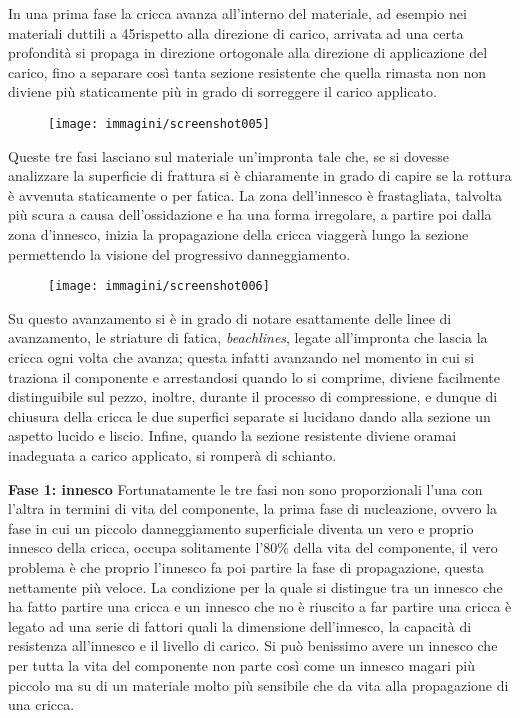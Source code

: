 \documentclass{article}
\begin{document}
\begin{adjustwidth}{2in}{}
		In una prima fase la cricca avanza all'interno del materiale, ad esempio nei materiali duttili a 45\degree rispetto alla direzione di carico, arrivata ad una certa profondità si propaga in direzione ortogonale alla direzione di applicazione del carico, fino a separare così tanta sezione resistente che quella rimasta non non diviene più staticamente più in grado di sorreggere il carico applicato. 
		
		\begin{figure}[H]
			\centering
			\texttt{[image: immagini/screenshot005]}
			\label{fig:screenshot005}
		\end{figure}
				
		Queste tre fasi lasciano sul materiale un'impronta tale che, se si dovesse analizzare la superficie di frattura si è chiaramente in grado di capire se la rottura è avvenuta staticamente o per fatica. La zona dell'innesco è frastagliata, talvolta più scura a causa dell'ossidazione e ha una forma irregolare, a partire poi dalla zona d'innesco, inizia la propagazione della cricca viaggerà lungo la sezione permettendo la visione del progressivo danneggiamento.
		
		\begin{figure}[H]
			\centering
			\texttt{[image: immagini/screenshot006]}
			\label{fig:screenshot006}
		\end{figure}		
		
		Su questo avanzamento si è in grado di notare esattamente delle linee di avanzamento, le striature di fatica, \textit{beachlines}, legate all'impronta che lascia la cricca ogni volta che avanza; questa infatti avanzando nel momento in cui si traziona il componente e arrestandosi quando lo si comprime, diviene facilmente distinguibile sul pezzo, inoltre, durante il processo di compressione, e dunque di chiusura della cricca le due superfici separate si lucidano dando alla sezione un aspetto lucido e liscio. Infine, quando la sezione resistente diviene oramai inadeguata a carico applicato, si romperà di schianto. \newline
		
		\textbf{Fase 1: innesco}\newline
		Fortunatamente le tre fasi non sono proporzionali l'una con l'altra in termini di vita del componente, la prima fase di nucleazione, ovvero la fase in cui un piccolo danneggiamento superficiale diventa un vero e proprio innesco della cricca, occupa solitamente l'80\% della vita del componente, il vero problema è che proprio l'innesco fa poi partire la fase di propagazione, questa nettamente più veloce. La condizione per la quale si distingue tra un innesco che ha fatto partire una cricca e un innesco che no è riuscito a far partire una cricca è legato ad una serie di fattori quali la dimensione dell'innesco, la capacità di resistenza all'innesco e il livello di carico. Si può benissimo avere un innesco che per tutta la vita del componente non parte così come un innesco magari più piccolo ma su di un materiale molto più sensibile che da vita alla propagazione di una cricca. 
	

\end{adjustwidth}
\end{document}
